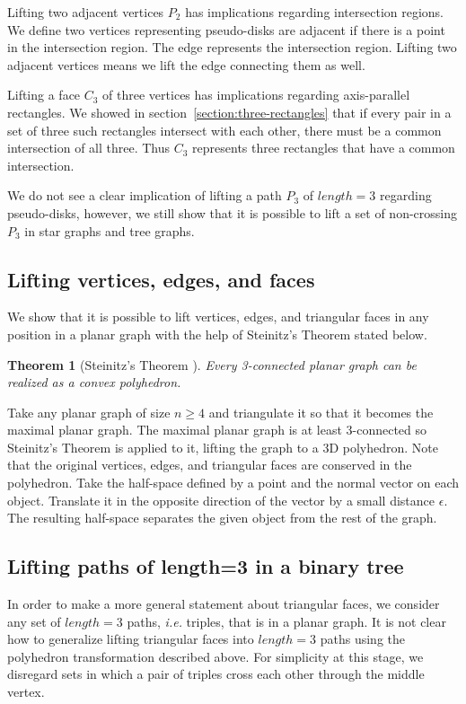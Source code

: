 \documentclass{NSF}
\newtheorem{theorem}{Theorem}[section]
\begin{document}
Lifting two adjacent vertices $P_2$ has implications regarding intersection regions. We define two vertices representing pseudo-disks are adjacent if there is a point in the intersection region. The edge represents the intersection region. Lifting two adjacent vertices means we lift the edge connecting them as well.

Lifting a face $C_3$ of three vertices has implications regarding axis-parallel rectangles. We showed in section~\ref{section:three-rectangles} that if every pair in a set of three such rectangles intersect with each other, there must be a common intersection of all three. Thus $C_3$ represents three rectangles that have a common intersection.

We do not see a clear implication of lifting a path $P_3$ of $length=3$ regarding pseudo-disks, however, we still show that it is possible to lift a set of non-crossing $P_3$ in star graphs and tree graphs.


\subsection{Lifting vertices, edges, and faces}

We show that it is possible to lift vertices, edges, and triangular faces in any position in a planar graph with the help of Steinitz's Theorem stated below. 

\begin{theorem}[Steinitz's Theorem \cite{weisstein}]
Every 3-connected planar graph can be realized as a convex polyhedron. 
\end{theorem}

Take any planar graph of size $n \geq 4$ and triangulate it so that it becomes the maximal planar graph. The maximal planar graph is at least 3-connected so Steinitz's Theorem is applied to it, lifting the graph to a 3D polyhedron. Note that the original vertices, edges, and triangular faces are conserved in the polyhedron. Take the half-space defined by a point and the normal vector on each object. Translate it in the opposite direction of the vector by a small distance $\epsilon$. The resulting half-space separates the given object from the rest of the graph.

\subsection{Lifting paths of length=3 in a binary tree}
In order to make a more general statement about triangular faces, we consider any set of $length=3$ paths, \textit{i.e.} triples, that is in a planar graph. It is not clear how to generalize lifting triangular faces into $length=3$ paths using the polyhedron transformation described above. For simplicity at this stage, we disregard sets in which a pair of triples cross each other through the middle vertex.
\end{document}
